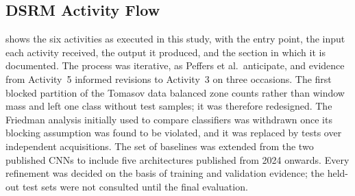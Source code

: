 \subsection{DSRM Activity Flow}
\label{sec:chap3DSRMFlow}
 shows the six activities as executed in this study, with the entry point, the input each activity received, the output it produced, and the section in which it is documented. The process was iterative, as Peffers et al.\ anticipate, and evidence from Activity~5 informed revisions to Activity~3 on three occasions. The first blocked partition of the Tomasov data balanced zone counts rather than window mass and left one class without test samples; it was therefore redesigned. The Friedman analysis initially used to compare classifiers was withdrawn once its blocking assumption was found to be violated, and it was replaced by tests over independent acquisitions. The set of baselines was extended from the two published CNNs to include five architectures published from 2024 onwards. Every refinement was decided on the basis of training and validation evidence; the held-out test sets were not consulted until the final evaluation.

